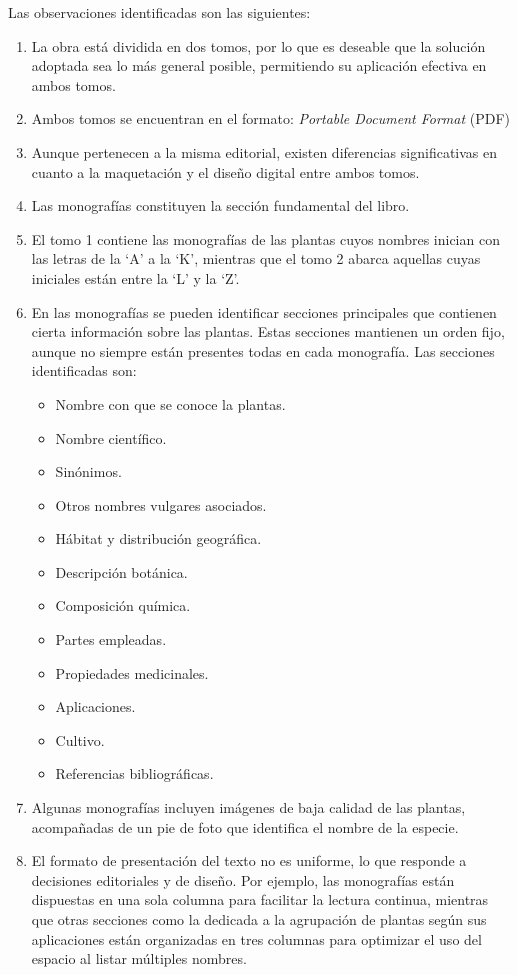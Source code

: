 Las observaciones identificadas son las siguientes:
\begin{enumerate}
    \item La obra está dividida en dos tomos, por lo que es deseable que la solución adoptada sea 
    lo más general posible, permitiendo su aplicación efectiva en ambos tomos.
    \item Ambos tomos se encuentran en el formato: \textit{Portable Document Format} (PDF)
    \item Aunque pertenecen a la misma editorial, existen diferencias significativas 
    en cuanto a la maquetación y el diseño digital entre ambos tomos.
    \item Las monografías constituyen la sección fundamental del libro.
    \item El tomo 1 contiene las monografías de las plantas cuyos nombres inician con las letras de 
    la `A' a la `K', mientras que el tomo 2 abarca aquellas cuyas iniciales están entre la `L' y la `Z'.
    \item En las monografías se pueden identificar secciones principales que contienen cierta información 
    sobre las plantas. Estas secciones mantienen un orden fijo, aunque no siempre están 
    presentes todas en cada monografía. Las secciones identificadas son:
    \begin{itemize}
        \item Nombre con que se conoce la plantas.
        \item Nombre científico.
        \item Sinónimos.
        \item Otros nombres vulgares asociados.
        \item Hábitat y distribución geográfica.
        \item Descripción botánica.
        \item Composición química.
        \item Partes empleadas.
        \item Propiedades medicinales.
        \item Aplicaciones.
        \item Cultivo.
        \item Referencias bibliográficas.
    \end{itemize}
    \item Algunas monografías incluyen imágenes de baja calidad de las plantas, 
    acompañadas de un pie de foto que identifica el nombre de la especie.
    \item El formato de presentación del texto no es uniforme, lo que responde a decisiones editoriales y 
    de diseño. Por ejemplo, las monografías están dispuestas en una sola columna para facilitar la lectura continua, 
    mientras que otras secciones como la dedicada a la agrupación de plantas según sus aplicaciones 
    están organizadas en tres columnas para optimizar el uso del espacio al listar múltiples nombres.
\end{enumerate}

